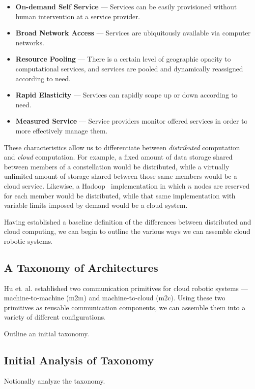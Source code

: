 \documentclass{sig-alternate}
\begin{document}
\begin{itemize}
\item {\bf On-demand Self Service} --- Services can be easily provisioned without human intervention at a service provider.
\item {\bf Broad Network Access} --- Services are ubiquitously available via computer networks.
\item {\bf Resource Pooling} --- There is a certain level of geographic opacity to computational services, and services are pooled and dynamically reassigned according to need.
\item {\bf Rapid Elasticity} --- Services can rapidly scape up or down according to need.
\item {\bf Measured Service} --- Service providers monitor offered services in order to more effectively manage them.
\end{itemize}

These characteristics allow us to differentiate between {\sl distributed} computation and {\sl cloud} computation.  For example, a fixed amount of data storage shared between members of a constellation would be distributed, while a virtually unlimited amount of storage shared between those same members would be a cloud service.  Likewise, a Hadoop~\cite{Hadoop} implementation in which $n$ nodes are reserved for each member would be distributed, while that same implementation with variable limits imposed by demand would be a cloud system.

Having established a baseline definition of the differences between distributed and cloud computing, we can begin to outline the various ways we can assemble cloud robotic systems.

\subsection{A Taxonomy of Architectures}
Hu et. al. established two communication primitives for cloud robotic systems --- machine-to-machine (m2m) and machine-to-cloud (m2c).  Using these two primitives as reusable communication components, we can assemble them into a variety of different configurations.

Outline an initial taxonomy.

\subsection{Initial Analysis of Taxonomy}
Notionally analyze the taxonomy.
\end{document}
